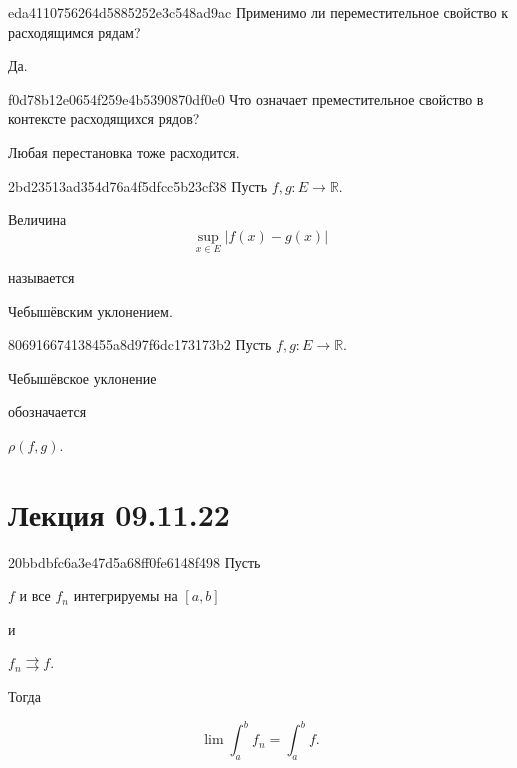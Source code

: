 \begin{note}{eda4110756264d5885252e3c548ad9ac}
    Применимо ли переместительное свойство к расходящимся рядам?

    \begin{cloze}{1}
        Да.
    \end{cloze}
\end{note}

\begin{note}{f0d78b12e0654f259e4b5390870df0e0}
    Что означает преместительное свойство в контексте расходящихся рядов?

    \begin{cloze}{1}
        Любая перестановка тоже расходится.
    \end{cloze}
\end{note}

\begin{note}{2bd23513ad354d76a4f5dfcc5b23cf38}
    Пусть \({ f, g : E \to \mathbb R }\).
    \begin{icloze}{1}
        Величина
        \[
            \sup_{x \in E} \left\lvert f(x) - g(x) \right\rvert
        \]
    \end{icloze}
    называется \begin{icloze}{2}Чебышёвским уклонением.\end{icloze}
\end{note}

\begin{note}{806916674138455a8d97f6dc173173b2}
    Пусть \({ f, g : E \to \mathbb R }\).
    \begin{icloze}{2}Чебышёвское уклонение\end{icloze} обозначается \begin{icloze}{1}\({ \rho(f, g) }\).\end{icloze}
\end{note}

\section{Лекция 09.11.22}
\begin{note}{20bbdbfc6a3e47d5a68ff0fe6148f498}
    Пусть \begin{icloze}{3}\({ f }\) и все \({ f_n }\) интегрируемы на \({ [a, b] }\)\end{icloze} и \begin{icloze}{2}\({ f_n \rightrightarrows f }\).\end{icloze}
    Тогда
    \begin{icloze}{1}
        \[
            \lim \int_{a}^{b} f_n = \int_{a}^{b} f.
        \]
    \end{icloze}
\end{note}

